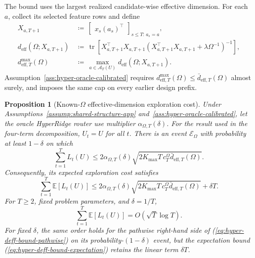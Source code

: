 \documentclass{article} %
\newtheorem{proposition}[theorem]{Proposition}
\renewcommand{\eqref}[1]{\textup{(\ref{#1})}}
\begin{document}
The bound uses the largest realized candidate-wise effective dimension. For
each \(a\), collect its selected feature rows and define
\begin{align}
X_{a,T+1}
&\,\coloneqq\,
\begin{bmatrix}
x_s(a_s)^\top
\end{bmatrix}_{s\le T:\,a_s=a},
\label{eq:hyper-oracle-XaT}
\\
d_{\mathrm{eff}}(\Omega;X_{a,T+1})
&\,\coloneqq\,
\operatorname{tr}
\!\left[
X_{a,T+1}^{\top}X_{a,T+1}
\left(
X_{a,T+1}^{\top}X_{a,T+1}+\lambda\Omega^{-1}
\right)^{-1}
\right],
\label{eq:hyper-oracle-deff-a}
\\
d_{\mathrm{eff},T}^{\max}(\Omega)
&\,\coloneqq\,
\max_{a\in\mathcal A_T(U)}
d_{\mathrm{eff}}(\Omega;X_{a,T+1}).
\label{eq:hyper-oracle-deff-max}
\end{align}
Assumption~\ref{ass:hyper-oracle-calibrated} requires
$d_{\mathrm{eff},T}^{\max}(\Omega)\le
\bar d_{\mathrm{eff},T}(\Omega)$ almost surely, and imposes the same cap on
every earlier design prefix.

\begin{proposition}[Known-\(\Omega\) effective-dimension exploration cost]
\label{prop:deff-bound-app}
Under Assumptions~\ref{assump:shared-structure-app}
and~\ref{ass:hyper-oracle-calibrated}, let the oracle HyperRidge router use
multiplier $\alpha_{\Omega,T}(\delta)$. For the result used in the four-term
decomposition, \(U_t=U\) for all \(t\). There is an event
$\mathcal E_\Omega$ with probability at least $1-\delta$ on which
\begin{equation}
\label{eq:hyper-deff-bound-pathwise}
\sum_{t=1}^{T}L_t(U)
\le
2\alpha_{\Omega,T}(\delta)
\sqrt{
2K_{\max}T\,c_T^\Omega
\bar d_{\mathrm{eff},T}(\Omega)
}.
\end{equation}
Consequently, its expected exploration cost satisfies
\begin{equation}
\label{eq:hyper-deff-bound-expectation}
\sum_{t=1}^{T}\mathbb{E}[L_t(U)]
\le
2\alpha_{\Omega,T}(\delta)
\sqrt{
2K_{\max}T\,c_T^\Omega
\bar d_{\mathrm{eff},T}(\Omega)
}
+
\delta T .
\end{equation}
For \(T\ge2\), fixed problem parameters, and $\delta=1/T$,
\begin{equation}
\label{eq:hyper-deff-bound-rate}
\sum_{t=1}^{T}\mathbb{E}[L_t(U)]
=
O\!\left(\sqrt{T}\log T\right).
\end{equation}
For fixed $\delta$, the same order holds for the pathwise right-hand side of
\eqref{eq:hyper-deff-bound-pathwise} on its probability-\((1-\delta)\) event,
but the expectation bound \eqref{eq:hyper-deff-bound-expectation} retains the
linear term $\delta T$.
\end{proposition}
\end{document}
